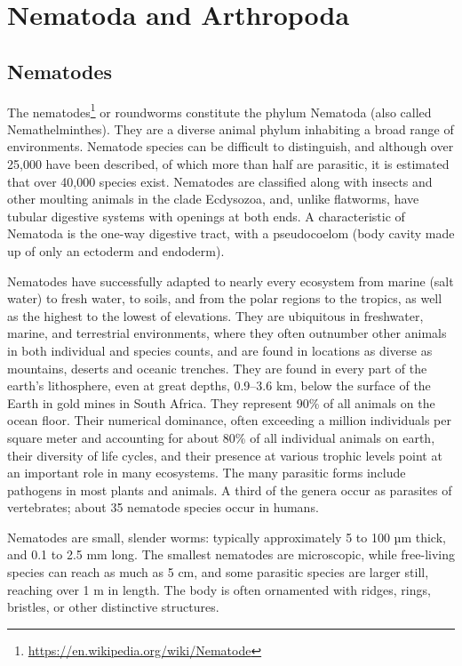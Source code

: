\documentclass[]{book}
\let\rmarkdownfootnote\footnote%
\def\footnote{\protect\rmarkdownfootnote}
\renewcommand{\href}[2]{#2\footnote{\url{#1}}}
\begin{document}
\hypertarget{nematoda-and-arthropoda}{%
\chapter{Nematoda and Arthropoda}\label{nematoda-and-arthropoda}}

\hypertarget{nematodes}{%
\section{Nematodes}\label{nematodes}}

The \href{https://en.wikipedia.org/wiki/Nematode}{nematodes} or roundworms constitute the phylum Nematoda (also called Nemathelminthes). They are a diverse animal phylum inhabiting a broad range of environments. Nematode species can be difficult to distinguish, and although over 25,000 have been described, of which more than half are parasitic, it is estimated that over 40,000 species exist. Nematodes are classified along with insects and other moulting animals in the clade Ecdysozoa, and, unlike flatworms, have tubular digestive systems with openings at both ends. A characteristic of Nematoda is the one-way digestive tract, with a pseudocoelom (body cavity made up of only an ectoderm and endoderm).

Nematodes have successfully adapted to nearly every ecosystem from marine (salt water) to fresh water, to soils, and from the polar regions to the tropics, as well as the highest to the lowest of elevations. They are ubiquitous in freshwater, marine, and terrestrial environments, where they often outnumber other animals in both individual and species counts, and are found in locations as diverse as mountains, deserts and oceanic trenches. They are found in every part of the earth's lithosphere, even at great depths, 0.9--3.6 km, below the surface of the Earth in gold mines in South Africa. They represent 90\% of all animals on the ocean floor. Their numerical dominance, often exceeding a million individuals per square meter and accounting for about 80\% of all individual animals on earth, their diversity of life cycles, and their presence at various trophic levels point at an important role in many ecosystems. The many parasitic forms include pathogens in most plants and animals. A third of the genera occur as parasites of vertebrates; about 35 nematode species occur in humans.

Nematodes are small, slender worms: typically approximately 5 to 100 µm thick, and 0.1 to 2.5 mm long. The smallest nematodes are microscopic, while free-living species can reach as much as 5 cm, and some parasitic species are larger still, reaching over 1 m in length. The body is often ornamented with ridges, rings, bristles, or other distinctive structures.
\end{document}
